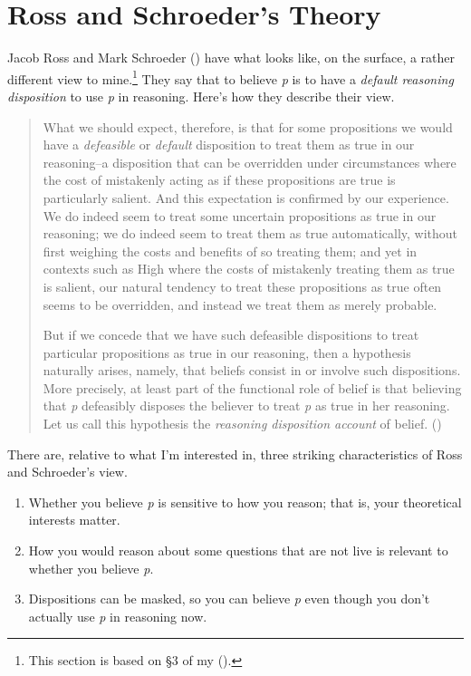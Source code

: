 \documentclass[
  12pt,
  letterpaper,
]{scrbook}
\providecommand{\tightlist}{%
  \setlength{\itemsep}{0pt}\setlength{\parskip}{0pt}}\usepackage{longtable,booktabs,array}
\begin{document}
\section{Ross and Schroeder's Theory}\label{sec-usc}

Jacob Ross and Mark Schroeder ()
have what looks like, on the surface, a rather different view to
mine.\footnote{This section is based on §3 of my
  ().} They say that to believe
\emph{p} is to have a \emph{default reasoning disposition} to use
\emph{p} in reasoning. Here's how they describe their view.

\begin{quote}
What we should expect, therefore, is that for some propositions we would
have a \emph{defeasible} or \emph{default} disposition to treat them as
true in our reasoning--a disposition that can be overridden under
circumstances where the cost of mistakenly acting as if these
propositions are true is particularly salient. And this expectation is
confirmed by our experience. We do indeed seem to treat some uncertain
propositions as true in our reasoning; we do indeed seem to treat them
as true automatically, without first weighing the costs and benefits of
so treating them; and yet in contexts such as High where the costs of
mistakenly treating them as true is salient, our natural tendency to
treat these propositions as true often seems to be overridden, and
instead we treat them as merely probable.

But if we concede that we have such defeasible dispositions to treat
particular propositions as true in our reasoning, then a hypothesis
naturally arises, namely, that beliefs consist in or involve such
dispositions. More precisely, at least part of the functional role of
belief is that believing that \emph{p} defeasibly disposes the believer
to treat \emph{p} as true in her reasoning. Let us call this hypothesis
the \emph{reasoning disposition account} of belief.
()
\end{quote}

There are, relative to what I'm interested in, three striking
characteristics of Ross and Schroeder's view.

\begin{enumerate}
\def\labelenumi{\arabic{enumi}.}
\tightlist
\item
  Whether you believe \emph{p} is sensitive to how you reason; that is,
  your theoretical interests matter.
\item
  How you would reason about some questions that are not live is
  relevant to whether you believe \emph{p}.
\item
  Dispositions can be masked, so you can believe \emph{p} even though
  you don't actually use \emph{p} in reasoning now.
\end{enumerate}
\end{document}
